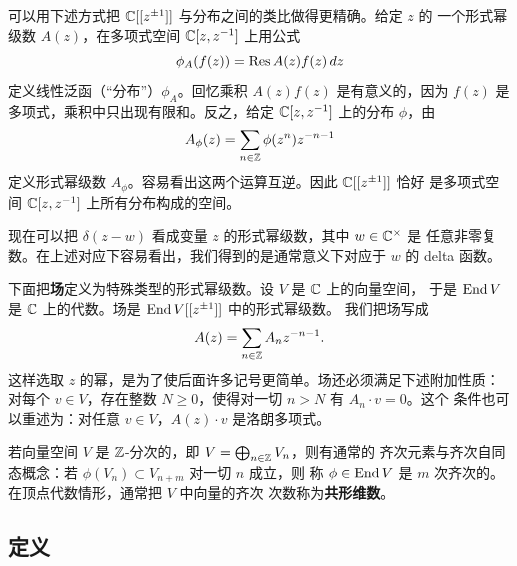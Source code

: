 可以用下述方式把 $\mathbb{C}[[z^{\pm1}]]$ 与分布之间的类比做得更精确。给定 $z$ 的
一个形式幂级数 $A(z)$，在多项式空间 $\mathbb{C}[z,z^{-1}]$ 上用公式
\[
    \phi_A(f(z))=\operatorname{Res} A(z)f(z)\,dz
\]
定义线性泛函（“分布”）$\phi_A$。回忆乘积 $A(z)f(z)$ 是有意义的，因为 $f(z)$
是多项式，乘积中只出现有限和。反之，给定 $\mathbb{C}[z,z^{-1}]$ 上的分布 $\phi$，由
\[
    A_\phi(z)=\sum_{n\in\mathbb{Z}}\phi(z^n)z^{-n-1}
\]
定义形式幂级数 $A_\phi$。容易看出这两个运算互逆。因此 $\mathbb{C}[[z^{\pm1}]]$ 恰好
是多项式空间 $\mathbb{C}[z,z^{-1}]$ 上所有分布构成的空间。

现在可以把 $\delta(z-w)$ 看成变量 $z$ 的形式幂级数，其中 $w\in\mathbb{C}^\times$ 是
任意非零复数。在上述对应下容易看出，我们得到的是通常意义下对应于 $w$ 的
delta 函数。

下面把\textbf{场}定义为特殊类型的形式幂级数。设 $V$ 是 $\mathbb{C}$ 上的向量空间，
于是 $\operatorname{End} V$ 是 $\mathbb{C}$ 上的代数。场是 $\operatorname{End} V[[z^{\pm1}]]$ 中的形式幂级数。
我们把场写成
\[
    A(z)=\sum_{n\in\mathbb{Z}}A_nz^{-n-1}.
\]
这样选取 $z$ 的幂，是为了使后面许多记号更简单。场还必须满足下述附加性质：
对每个 $v\in V$，存在整数 $N\ge0$，使得对一切 $n>N$ 有 $A_n\cdot v=0$。这个
条件也可以重述为：对任意 $v\in V$，$A(z)\cdot v$ 是洛朗多项式。

若向量空间 $V$ 是 $\mathbb{Z}$-分次的，即 $V=\bigoplus_{n\in\mathbb{Z}}V_n$，则有通常的
齐次元素与齐次自同态概念：若 $\phi(V_n)\subset V_{n+m}$ 对一切 $n$ 成立，则
称 $\phi\in\operatorname{End} V$ 是 $m$ 次齐次的。在顶点代数情形，通常把 $V$ 中向量的齐次
次数称为\textbf{共形维数}。

\subsection{定义}

